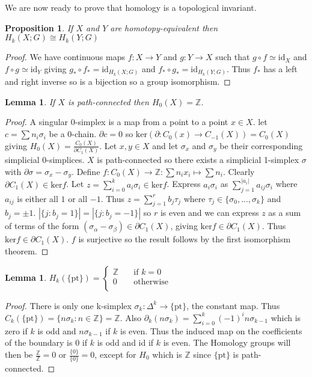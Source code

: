 \documentclass{article}
\newtheorem{lemma}[theorem]{Lemma}
\newtheorem{proposition}[theorem]{Proposition}
\begin{document}
\noindent We are now ready to prove that homology is a topological invariant.
\begin{proposition}
If $X$ and $Y$ are homotopy-equivalent then $H_k(X;G)\cong H_k(Y;G)$
\end{proposition}
\begin{proof}
We have continuous maps $f\colon X\to Y$ and $g\colon Y\to X$ such that $g\circ f\simeq\text{id}_X$ and $f\circ g\simeq\text{id}_Y$ giving $g_*\circ f_*=\text{id}_{H_k(X;G)}$ and $f_*\circ g_*=\text{id}_{H_k(Y;G)}$. Thus $f_*$ has a left and right inverse so is a bijection so a group isomorphism.
\end{proof}

\begin{lemma}
If $X$ is path-connected then $H_0(X)=\mathbb{Z}$.
\end{lemma}
\begin{proof}
A singular 0-simplex is a map from a point to a point $x\in X$. let $c=\sum n_i\sigma_i$ be a 0-chain. $\partial c=0$ so $\text{ker}(\partial:C_{0}(x)\rightarrow C_{-1}(X))=C_0(X)$ giving $H_0(X)=\frac{C_0(X)}{\partial C_1(X)}$. Let $x,y\in X$ and let $\sigma_x$ and $\sigma_y$ be their corresponding simplicial 0-simplices. $X$ is path-connected so there exists a simplicial 1-simplex $\sigma$ with $\partial\sigma=\sigma_x-\sigma_y$. Define $f\colon C_0(X)\to\mathbb{Z}:\sum n_ix_i\mapsto\sum n_i$. Clearly $\partial C_1(X)\in \text{ker}f$. Let $z=\sum_{i=0}^ka_i\sigma_i\in\text{ker}f$. Express $a_i\sigma_i$ as $\sum_{j=1}^{|a_i|}a_{ij}\sigma_i$ where $a_{ij}$ is either all $1$ or all $-1$. Thus $z=\sum_{j=1}^rb_j\tau_j$ where $\tau_j\in\{\sigma_0,...,\sigma_k\}$ and $b_j=\pm1$. $|\{j:b_j=1\}|=|\{j:b_j=-1\}|$ so $r$ is even and we can express $z$ as a sum of terms of the form $(\sigma_\alpha - \sigma_\beta)\in\partial C_1(X)$, giving $\text{ker}f\in\partial C_1(X)$. Thus $\text{ker}f\in\partial C_1(X)$. $f$ is surjective so the result follows by the first isomorphism theorem.
\end{proof}

\begin{lemma}
$H_k(\{\text{pt}\})=\begin{cases}
       \mathbb{Z} &\quad\text{if }k=0 \\
       0 &\quad\text{otherwise} \\ 
     \end{cases}$
\end{lemma}
\begin{proof}
There is only one k-simplex $\sigma_k\colon\Delta^k\rightarrow \{\text{pt}\}$, the constant map. Thus $C_k(\{\text{pt}\})=\{n\sigma_k:n\in\mathbb{Z}\}=\mathbb{Z}$.
Also $\partial_k(n\sigma_k)=\sum_{i=0}^k(-1)^i n\sigma_{k-1}$ which is zero if $k$ is odd and $n\sigma_{k-1}$ if $k$ is even. Thus the induced map on the coefficients of the boundary is $0$ if $k$ is odd and id if $k$ is even. The Homology groups will then be $\frac{\mathbb{Z}}{\mathbb{Z}}=0$ or $\frac{\{0\}}{\{0\}}=0$, except for $H_0$ which is $\mathbb{Z}$ since $\{\text{pt}\}$ is path-connected.
\end{proof}
\end{document}
